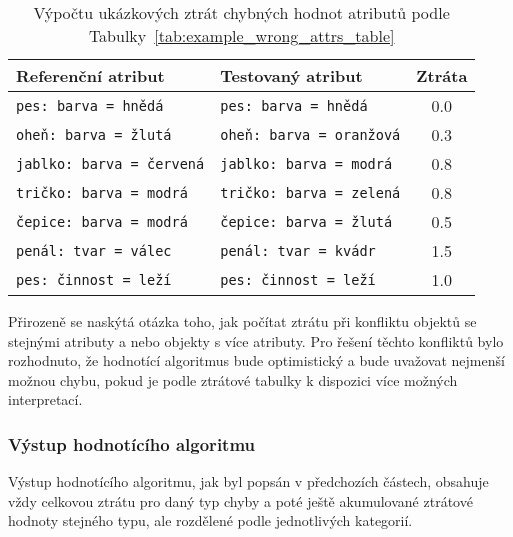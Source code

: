 \begin{table}[H]
	\centering
	\begin{tabular}{|l|l|c|}
		\hline
		\textbf{Referenční atribut}      & \textbf{Testovaný atribut}      & \textbf{Ztráta} \\
		\hline
		\texttt{pes: barva = hnědá}      & \texttt{pes: barva = hnědá}     & 0.0             \\
		\texttt{oheň: barva = žlutá}     & \texttt{oheň: barva = oranžová} & 0.3             \\
		\texttt{jablko: barva = červená} & \texttt{jablko: barva = modrá}  & 0.8             \\
		\texttt{tričko: barva = modrá}   & \texttt{tričko: barva = zelená} & 0.8             \\
		\texttt{čepice: barva = modrá}   & \texttt{čepice: barva = žlutá}  & 0.5             \\
		\texttt{penál: tvar = válec}     & \texttt{penál: tvar = kvádr }   & 1.5             \\
		\texttt{pes: činnost = leží}     & \texttt{pes: činnost = leží }   & 1.0             \\
		\hline
	\end{tabular}
	\caption{Výpočtu ukázkových ztrát chybných hodnot atributů podle Tabulky~\ref{tab:example_wrong_attrs_table}}\label{tab:example_wrong_attrs_values}
\end{table}

Přirozeně se naskýtá otázka toho, jak počítat ztrátu při konfliktu objektů se stejnými atributy a nebo objekty s více atributy.
Pro řešení těchto konfliktů bylo rozhodnuto, že hodnotící algoritmus bude optimistický a bude uvažovat nejmenší možnou chybu,
pokud je podle ztrátové tabulky k dispozici více možných interpretací.

\subsubsection{Výstup hodnotícího algoritmu}
Výstup hodnotícího algoritmu, jak byl popsán v předchozích částech, obsahuje vždy celkovou ztrátu pro daný typ chyby
a poté ještě akumulované ztrátové hodnoty stejného typu, ale rozdělené podle jednotlivých kategorií.

